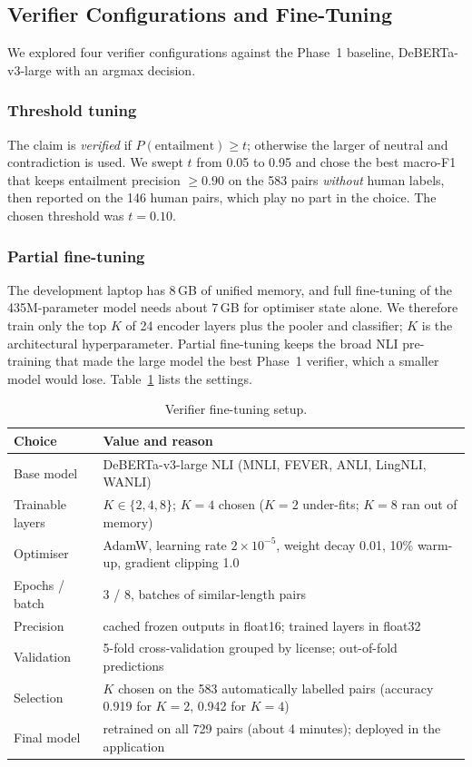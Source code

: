 \subsection{Verifier Configurations and Fine-Tuning}
\label{ss:verifiermethod}

We explored four verifier configurations against the Phase~1 baseline, DeBERTa-v3-large with an argmax decision.

\subsubsection{Threshold tuning}
The claim is \emph{verified} if $P(\text{entailment}) \geq t$; otherwise the larger of neutral and contradiction is used. We swept $t$ from 0.05 to 0.95 and chose the best macro-F1 that keeps entailment precision $\geq 0.90$ on the 583 pairs \emph{without} human labels, then reported on the 146 human pairs, which play no part in the choice. The chosen threshold was $t = 0.10$.

\subsubsection{Partial fine-tuning}
The development laptop has 8\,GB of unified memory, and full fine-tuning of the 435M-parameter model needs about 7\,GB for optimiser state alone. We therefore train only the top $K$ of 24 encoder layers plus the pooler and classifier; $K$ is the architectural hyperparameter. Partial fine-tuning keeps the broad NLI pre-training that made the large model the best Phase~1 verifier, which a smaller model would lose. Table~\ref{tab:hparams} lists the settings.

\begin{table}[tb]
    \caption{Verifier fine-tuning setup.}
    \label{tab:hparams}
    \centering
    \footnotesize
    \begin{tabularx}{\columnwidth}{@{}lX@{}}
        \toprule
        \textbf{Choice} & \textbf{Value and reason} \\
        \midrule
        Base model & DeBERTa-v3-large NLI (MNLI, FEVER, ANLI, LingNLI, WANLI)~\cite{laurer2024less} \\
        Trainable layers & $K \in \{2, 4, 8\}$; $K=4$ chosen ($K=2$ under-fits; $K=8$ ran out of memory) \\
        Optimiser & AdamW, learning rate $2\times10^{-5}$, weight decay 0.01, 10\% warm-up, gradient clipping 1.0 \\
        Epochs / batch & 3 / 8, batches of similar-length pairs \\
        Precision & cached frozen outputs in float16; trained layers in float32 \\
        Validation & 5-fold cross-validation grouped by license; out-of-fold predictions \\
        Selection & $K$ chosen on the 583 automatically labelled pairs (accuracy 0.919 for $K=2$, 0.942 for $K=4$) \\
        Final model & retrained on all 729 pairs (about 4 minutes); deployed in the application \\
        \bottomrule
    \end{tabularx}
\end{table}

